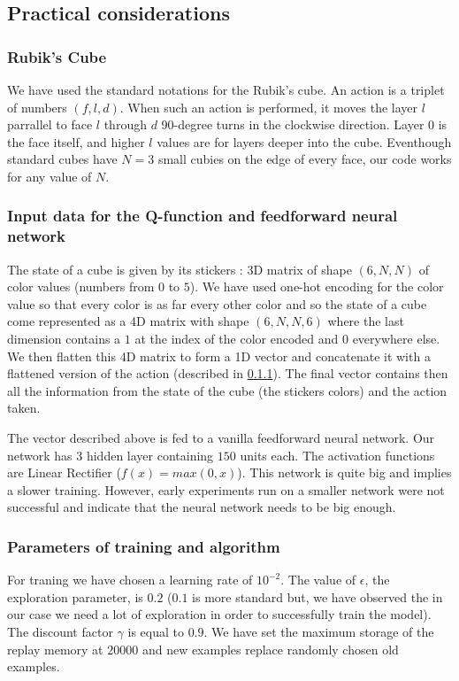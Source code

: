 \documentclass{article} %
\begin{document}
\subsection{Practical considerations}

\subsubsection{Rubik's Cube}
\label{action}
We have used the standard notations for the Rubik's cube. An action is a triplet of numbers $(f, l, d)$. When such an action is performed, it moves the layer $l$ parrallel to face $l$ through $d$ 90-degree turns in the clockwise direction. Layer $0$ is the face itself, and higher $l$ values are for layers deeper into the cube. Eventhough standard cubes have $N=3$ small cubies on the edge of every face, our code works for any value of $N$.

\subsubsection{Input data for the Q-function and feedforward neural network}
The state of a cube is given by its stickers : 3D matrix of shape $(6, N, N)$ of color values (numbers from $0$ to $5$). We have used one-hot encoding for the color value so that every color is as far every other color and so the state of a cube come represented as a 4D matrix with shape $(6, N, N, 6)$ where the last dimension contains a $1$ at the index of the color encoded and $0$ everywhere else. We then flatten this 4D matrix to form a 1D vector and concatenate it with a flattened version of the action (described in \ref{action}). The final vector contains then all the information from the state of the cube (the stickers colors) and the action taken.

The vector described above is fed to a vanilla feedforward neural network. Our network has $3$ hidden layer containing $150$ units each. The activation functions are Linear Rectifier ($f(x) = max(0, x)$). This network is quite big and implies a slower training. However, early experiments run on a smaller network were not successful and indicate that the neural network needs to be big enough.

\subsubsection{Parameters of training and algorithm}
For traning we have chosen a learning rate of $10^{-2}$. The value of $\epsilon$, the exploration parameter, is $0.2$ ($0.1$ is more standard but, we have observed the in our case we need a lot of exploration in order to successfully train the model). The discount factor $\gamma$ is equal to $0.9$. We have set the maximum storage of the replay memory at $20000$ and new examples replace randomly chosen old examples.
\end{document}
